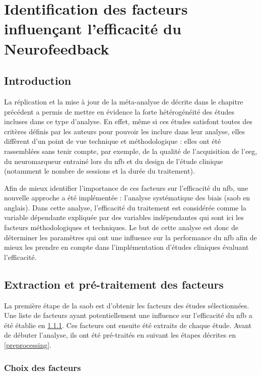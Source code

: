\chapter{Identification des facteurs influençant l'efficacité du Neurofeedback} \label{ch-saob}

\section*{Introduction}

La réplication et la mise à jour de la méta-analyse de \citet{Cortese2016} décrite dans le chapitre précédent a permis de mettre en évidence la forte 
hétérogénéité des études incluses dans ce type d'analyse. En effet, même si ces études satisfont toutes des critères définis par les auteurs pour pouvoir
les inclure dans leur analyse, elles diffèrent d'un point de vue technique et méthodologique : elles ont été rassemblées sans tenir compte, par exemple, 
de la qualité de l'acquisition de l'\gls{eeg}, du neuromarqueur entrainé lors du \gls{nfb} et du design de l'étude clinique (notamment le nombre de sessions 
et la durée du traitement). 

Afin de mieux identifier l'importance de ces facteurs sur l'efficacité du \gls{nfb}, une nouvelle approche a été implémentée : l'analyse systématique des biais 
(\gls{saob} en anglais). Dans cette analyse, l'efficacité du traitement est considérée comme la variable dépendante expliquée par des variables indépendantes 
qui sont ici les facteurs méthodologiques et techniques. Le but de cette analyse est donc de déterminer les paramètres qui ont une influence sur la performance du 
\gls{nfb} afin de mieux les prendre en compte dans l'implémentation d'études cliniques évaluant l'efficacité. 
\clearpage

\section{Extraction et pré-traitement des facteurs}

La première étape de la \gls{saob} est d'obtenir les facteurs des études sélectionnées. Une liste de facteurs ayant potentiellement une influence sur 
l'efficacité du \gls{nfb} a été établie en \ref{choix_des_facteurs}. Ces facteurs ont ensuite été extraits de chaque étude. Avant de débuter l'analyse, ils ont été pré-traités en 
suivant les étapes décrites en \ref{preprocessing}. 

\subsection{Choix des facteurs} \label{choix_des_facteurs}

